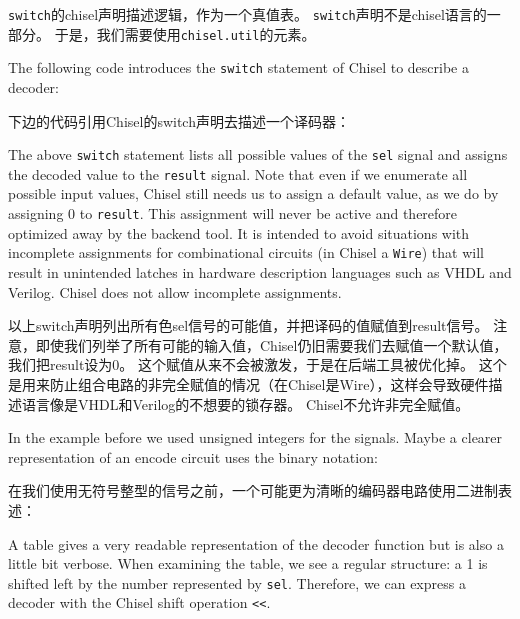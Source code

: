 \documentclass[%
    10pt,
    headinclude, footexclude,
    openright, %
    notitlepage,
    cleardoubleempty,
    headsepline,
    pointlessnumbers,
    bibtotoc, idxtotoc,
    ]{scrbook}
\newcommand{\code}[1]{{\small{\texttt{#1}}}}
\newcommand{\todo}[1]{{\emph{TODO: #1}}}
\renewcommand{\todo}[1]{}
\begin{document}
\code{switch}的chisel声明描述逻辑，作为一个真值表。
\code{switch}声明不是chisel语言的一部分。
于是，我们需要使用\code{chisel.util}的元素。


\noindent The following code introduces the \code{switch} statement of Chisel to describe a decoder:

下边的代码引用Chisel的switch声明去描述一个译码器：


\noindent The above \code{switch} statement lists all possible values of the \code{sel} signal
and assigns the decoded value to the \code{result} signal.
Note that even if we enumerate all possible input values, Chisel still needs us to assign a
default value, as we do by assigning 0 to \code{result}.
This assignment will never be active and therefore optimized away by the backend tool.
It is intended to avoid situations with incomplete assignments for combinational circuits
(in Chisel a \code{Wire}) that will result in unintended latches in hardware description
languages such as VHDL and Verilog. Chisel does not allow incomplete assignments.

以上switch声明列出所有色sel信号的可能值，并把译码的值赋值到result信号。
注意，即使我们列举了所有可能的输入值，Chisel仍旧需要我们去赋值一个默认值，我们把result设为0。
这个赋值从来不会被激发，于是在后端工具被优化掉。
这个是用来防止组合电路的非完全赋值的情况（在Chisel是Wire），这样会导致硬件描述语言像是VHDL和Verilog的不想要的锁存器。
Chisel不允许非完全赋值。

In the example before we used unsigned integers for the signals. Maybe a clearer representation
of an encode circuit uses the binary notation:

在我们使用无符号整型的信号之前，一个可能更为清晰的编码器电路使用二进制表述：


\todo{from Luca: for very small examples. What if the one-hot input is 256 wires? Can Chisel capture that? Or I need 256 lines? I would suggest to put an additional example. Maybe there is something like the for loop in VHDL.}

A table gives a very readable representation of the decoder function but is also
a little bit verbose.
When examining the table, we see a regular structure: a 1 is shifted left by the number
represented by \code{sel}. Therefore, we can express a decoder with the Chisel shift
operation \code{<<}.
\end{document}
